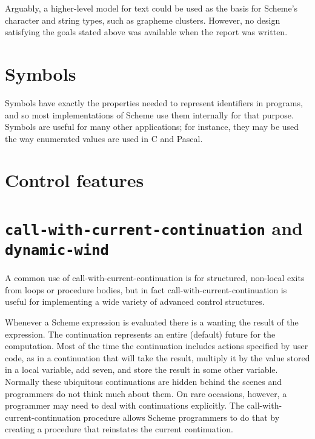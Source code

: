 \documentclass[twoside,twocolumn]{algol60}
\begin{document}
Arguably, a higher-level model for text could be used as the basis for
Scheme's character and string types, such as grapheme clusters.
However, no design satisfying the goals stated above was available
when the report was written.

\section{Symbols}

Symbols have exactly the properties needed to represent
identifiers in programs, and so most implementations
of Scheme use them internally for that purpose.  Symbols are useful
for many other applications; for instance, they may be used the way
enumerated values are used in C and Pascal.

\section{Control features}

\section{{\tt call-with-current-continuation} and {\tt dynamic-wind}}

\vest A common use of {\cf call-with-current-continuation} is for
structured, non-local exits from loops or procedure bodies, but in fact
{\cf call-with-current-continuation} is useful for implementing a
wide variety of advanced control structures.

\vest Whenever a Scheme expression is evaluated there is a
 wanting the result of the expression.  The continuation
represents an entire (default) future for the computation.
Most of the time the continuation includes actions
specified by user code, as in a continuation that will take the result,
multiply it by the value stored in a local variable, add seven, and store
the result in some other variable.  Normally these
ubiquitous continuations are hidden behind the scenes and programmers do not
think much about them.  On rare occasions, however, a programmer may
need to deal with continuations explicitly.
The {\cf call-with-current-continuation} procedure allows Scheme programmers to do
that by creating a procedure that reinstates the current continuation.
\end{document}
